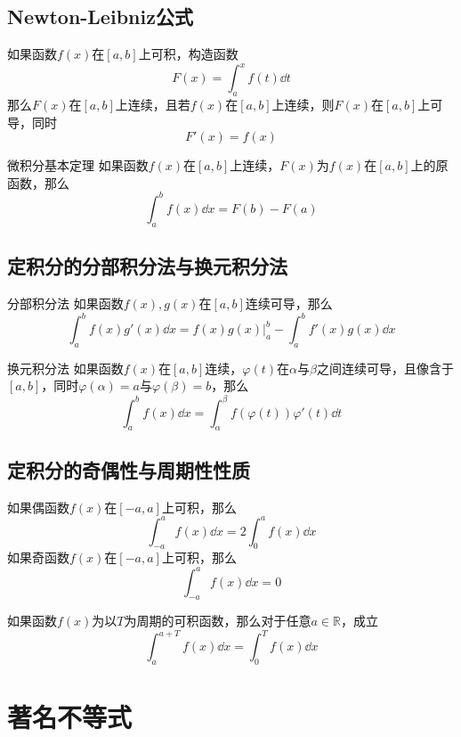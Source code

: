\documentclass[lang = cn, scheme = chinese, thmcnt = section]{elegantbook}
\newcommand{\R}{\mathbb{R}}            %
\begin{document}
\subsection{Newton-Leibniz公式}

\begin{theorem}
	如果函数$f(x)$在$[a,b]$上可积，构造函数
	$$
	F(x)=\int_a^x f(t)\dd t
	$$
	那么$F(x)$在$[a,b]$上连续，且若$f(x)$在$[a,b]$上连续，则$F(x)$在$[a,b]$上可导，同时
	$$
	F'(x)=f(x)
	$$
\end{theorem}

\begin{theorem}{微积分基本定理}
	如果函数$f(x)$在$[a,b]$上连续，$F(x)$为$f(x)$在$[a,b]$上的原函数，那么
	$$
	\int_a^b f(x)\dd x=F(b)-F(a)
	$$
\end{theorem}

\subsection{定积分的分部积分法与换元积分法}

\begin{theorem}{分部积分法}
	如果函数$f(x),g(x)$在$[a,b]$连续可导，那么
	$$
	\int_a^b f(x)g'(x)\dd x
	=f(x)g(x)\bigg| _a^b-\int_a^b f'(x)g(x)\dd x
	$$
\end{theorem}

\begin{theorem}{换元积分法}
	如果函数$f(x)$在$[a,b]$连续，$\varphi(t)$在$\alpha$与$\beta$之间连续可导，且像含于$[a,b]$，同时$\varphi(\alpha)=a$与$\varphi(\beta)=b$，那么
	$$
	\int_a^b f(x)\dd x
	=\int_\alpha^\beta f(\varphi(t))\varphi'(t)\dd t
	$$
\end{theorem}

\subsection{定积分的奇偶性与周期性性质}

\begin{theorem}
	如果偶函数$f(x)$在$[-a,a]$上可积，那么
	$$
	\int_{-a}^a f(x)\dd x
	=2\int_{0}^a f(x)\dd x
	$$
	如果奇函数$f(x)$在$[-a,a]$上可积，那么
	$$
	\int_{-a}^a f(x)\dd x
	=0
	$$
\end{theorem}

\begin{theorem}
	如果函数$f(x)$为以$T$为周期的可积函数，那么对于任意$a\in\R$，成立
	$$
	\int_{a}^{a+T} f(x)\dd x
	=\int_{0}^{T} f(x)\dd x
	$$
\end{theorem}

\section{著名不等式}
\end{document}
